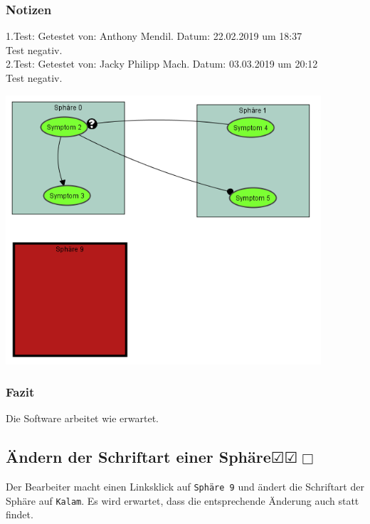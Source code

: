 \documentclass[enabledeprecatedfontcommands]{scrartcl}
\newcommand{\subsectiont}[2]{\subsection[#1]{#1{\normalsize\normalfont #2}}}
\newcommand{\leer}{$\Box$}
\newcommand{\ok}{$\CheckedBox$}
\begin{document}
\subsubsection{Notizen}
1.Test: Getestet von: Anthony Mendil. Datum: 22.02.2019 um 18:37 \\
Test negativ.\\
2.Test: Getestet von: Jacky Philipp Mach. Datum: 03.03.2019 um 20:12 \\
Test negativ. 
\begin{center}
\includegraphics[height=10cm]{2_14.PNG}
\end{center}
\subsubsection{Fazit}
Die Software arbeitet wie erwartet.

\subsectiont{Ändern der Schriftart einer Sphäre}{\dotfill\ok\ok\leer}
Der Bearbeiter macht einen Linksklick auf \texttt{Sphäre 9} und ändert die Schriftart der Sphäre auf \texttt{Kalam}. Es wird erwartet, dass die entsprechende Änderung auch statt findet. 
\end{document}
